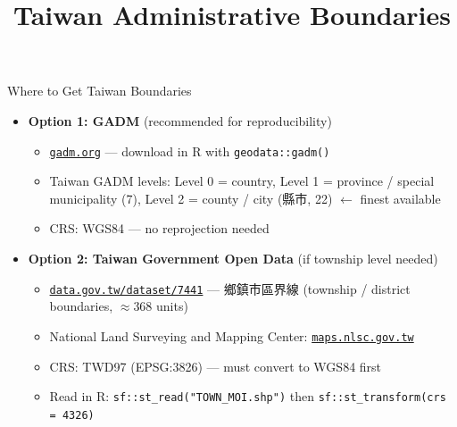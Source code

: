 \documentclass[dvipsnames,hyperref={pdfpagelabels=false}]{beamer}
\begin{document}
\title[]{Taiwan Administrative Boundaries}
\author{}
\institute{}
\date{}
\begin{frame}{}
  \titlepage
\end{frame}


\begin{frame}{Where to Get Taiwan Boundaries}
\begin{itemize}
  \item \textbf{Option 1: GADM} (recommended for reproducibility)
  \vspace{0.1cm}
  \begin{itemize}
    \item \href{https://gadm.org}{\texttt{gadm.org}} ---
          download in R with \texttt{geodata::gadm()}
    \vspace{0.1cm}
    \item Taiwan GADM levels: \quad
          Level 0 = country, \quad
          Level 1 = province / special municipality (7),\quad
          Level 2 = county / city (縣市, 22) $\leftarrow$ finest available
    \vspace{0.1cm}
    \item CRS: WGS84 --- no reprojection needed
  \end{itemize}
  \vspace{0.3cm}
  \item \textbf{Option 2: Taiwan Government Open Data}
        (if township level needed)
  \vspace{0.1cm}
  \begin{itemize}
    \item \href{https://data.gov.tw/dataset/7441}{\texttt{data.gov.tw/dataset/7441}}
          --- 鄉鎮市區界線 (township / district boundaries,
          $\approx$368 units)
    \vspace{0.1cm}
    \item National Land Surveying and Mapping Center:
          \href{https://maps.nlsc.gov.tw}{\texttt{maps.nlsc.gov.tw}}
    \vspace{0.1cm}
    \item CRS: TWD97 (EPSG:3826) --- must convert to WGS84 first
    \vspace{0.1cm}
    \item Read in R: \texttt{sf::st\_read("TOWN\_MOI.shp")} then
          \texttt{sf::st\_transform(crs = 4326)}
  \end{itemize}
\end{itemize}
\end{frame}
\end{document}
